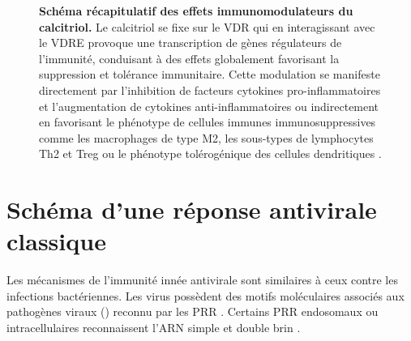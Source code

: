 \documentclass[
  a4paper,
  DIV=11,
  numbers=noendperiod,
  listof=totoc]{scrreprt}
\begin{document}
\begin{figure}


\caption[Schéma récapitulatif des effets immunomodulateurs du
calcitriol.]{\label{fig-immunomod}\textbf{Schéma récapitulatif des
effets immunomodulateurs du calcitriol.} Le calcitriol se fixe sur le
\ac{VDR} qui en interagissant avec le \ac{VDRE} provoque une
transcription de gènes régulateurs de l'immunité, conduisant à des
effets globalement favorisant la suppression et tolérance immunitaire.
Cette modulation se manifeste directement par l'inhibition de facteurs
cytokines pro-inflammatoires et l'augmentation de cytokines
anti-inflammatoires ou indirectement en favorisant le phénotype de
cellules immunes immunosuppressives comme les macrophages de type M2,
les sous-types de lymphocytes \ac{Th2} et \ac{Treg} ou le phénotype
tolérogénique des cellules dendritiques \autocite{Meza-Meza.2022}.}

\end{figure}%

\section{Schéma d'une réponse antivirale
classique}\label{schuxe9ma-dune-ruxe9ponse-antivirale-classique}

Les mécanismes de l'immunité innée antivirale sont similaires à ceux
contre les infections bactériennes. Les virus possèdent des motifs
moléculaires associés aux pathogènes viraux () reconnu par
les \ac{PRR} \autocite{Iwasaki.2012}. Certains \ac{PRR} endosomaux ou
intracellulaires reconnaissent l'ARN simple et double brin
\autocite{Bishop.2021,Ismailova.2022}.
\end{document}

